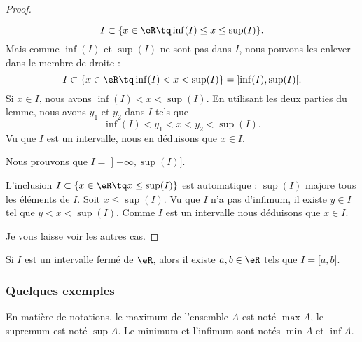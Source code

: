 \begin{proof}
\begin{subproof}
\begin{subproof}
\begin{equation}
						I\subset\{ x\in \eR\tq \inf(I)\leq x\leq \sup(I) \}.
					\end{equation}
					Mais comme \( \inf(I)\) et \( \sup(I)\) ne sont pas dans \( I\), nous pouvons les enlever dans le membre de droite :
					\begin{equation}
						I\subset\{ x\in \eR\tq \inf(I)<x<\sup(I) \}= \mathopen] \inf(I) , \sup(I) \mathclose[.
					\end{equation}
					Si \( x\in I\), nous avons \( \inf(I)<x<\sup(I)\). En utilisant les deux parties du lemme, nous avons \( y_1\) et \( y_2\) dans \( I\) tels que
					\begin{equation}
						\inf(I)<y_1<x<y_2<\sup(I).
					\end{equation}
					Vu que \( I\) est un intervalle, nous en déduisons que \( x\in I\).
				\end{subproof}
				\spitem[\( \inf(I)=-\infty\), \( \sup(I)\in I\)]
				Nous prouvons que \( I=\mathopen] -\infty , \sup(I) \mathclose]\).
		\begin{subproof}
			L'inclusion \( I\subset\{ x\in \eR\tq x\leq \sup(I) \}\) est automatique : \( \sup(I)\) majore tous les éléments de \( I\).
			Soit \( x\leq \sup(I)\). Vu que \( I\) n'a pas d'infimum, il existe \( y\in I\) tel que \( y<x<\sup(I)\). Comme \( I\) est un intervalle nous déduisons que \( x\in I\).
		\end{subproof}
	\end{subproof}
	Je vous laisse voir les autres cas.
\end{proof}

\begin{proposition}	\label{PROPooBWXYooDcwXrp}
	Si \( I\) est un intervalle fermé de \( \eR\), alors il existe \( a,b\in \eR\) tels que \( I=\mathopen[ a,b\mathclose]\).
\end{proposition}


\subsubsection{Quelques exemples}

En matière de notations, le maximum de l'ensemble \( A\) est noté \( \max A\), le supremum est noté \( \sup A\). Le minimum et l'infimum sont notés \( \min A\) et \( \inf A\).

